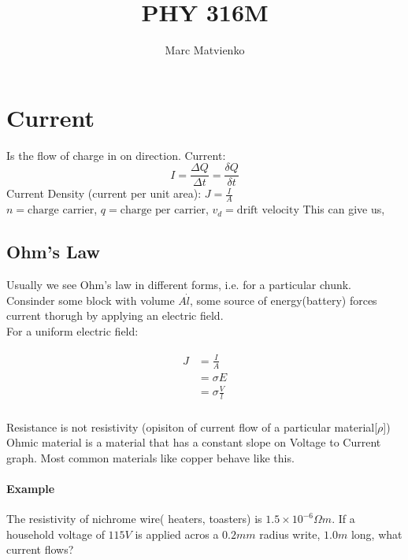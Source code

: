 \documentclass{article}
\title{PHY 316M}
\author{Marc Matvienko}
\begin{document}
    \maketitle %
    
    \section{Current}
    Is the flow of charge in on direction.
    Current: $$I=\frac{\Delta Q}{\Delta t} =\frac{\delta Q}{\delta t}$$
    Current Density (current per unit area): $J = \frac{I}{A}$\\
    $n = \text{charge carrier}$, $q = \text{charge per carrier}$, $v_d = \text{drift velocity}$
    This can give us, 
    
    \subsection{Ohm's Law}
    Usually we see Ohm's law in different forms, i.e. for a particular chunk.\\
    Consinder some block with volume $A\dot l$, some source of energy(battery) forces current thorugh by applying an electric field.\\
    For a uniform electric field: 
    
    \begin{align*}
        \begin{split}
            J &= \frac{I}{A} \\
            &= \sigma E \\
            &= \sigma \frac{V}{l}
        \end{split}
    \end{align*}
   \\
    Resistance is not resistivity (opisiton of current flow of a particular material[$\rho$])
    Ohmic material is a material that has a constant slope on Voltage to Current graph. Most common materials like copper behave like this.
    \paragraph{Example} The resistivity of nichrome wire( heaters, toasters) is $1.5 \times 10^{-6}\Omega m$. 
    If a household voltage of $115V$ is applied acros a $0.2mm$ radius write, $1.0m$ long, what current flows?
\end{document}

